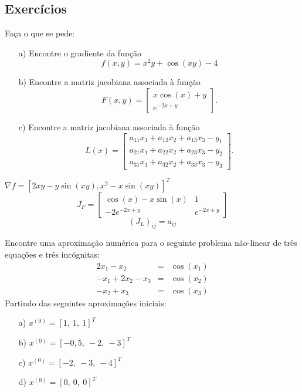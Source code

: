 
\fi

\subsection*{Exercícios}

\begin{exer} Faça o que se pede:
\begin{itemize}
\item[a)] Encontre o gradiente da função $$f(x,y)=x^2y+\cos(xy)-4$$
\item[b)] Encontre a matriz jacobiana associada à função
$$F(x,y)=\left[\begin{array}{c}x\cos(x)+y\\ e^{-2x+y}\end{array} \right].$$
\item[c)] Encontre a matriz jacobiana associada à função
$$L(x)=\left[\begin{array}{c}
a_{11}x_1 + a_{12}x_2 +a_{13}x_3-y_1\\
a_{21}x_1 + a_{22}x_2 +a_{23}x_3-y_2\\
a_{31}x_1 + a_{32}x_2 +a_{33}x_3-y_3
\end{array}
 \right].$$
\end{itemize}

 \end{exer}

\begin{resp}
$\nabla f = [2xy-y\sin(xy), x^2-x\sin(xy)]^T$
$$J_F=\left[\begin{array}{cc}
\cos(x)-x\sin(x) & 1\\
-2e^{-2x+y} &e^{-2x+y}
\end{array}
\right]$$
$$\left(J_L\right)_{ij}=a_{ij}$$
\end{resp}


\begin{exer} Encontre uma aproximação numérica para o seguinte problema não-linear de três equações e três incógnitas:
\begin{eqnarray*}
2x_1-x_2&=&\cos(x_1)\\
-x_1+2x_2-x_3&=&\cos(x_2)\\
-x_2+	x_3&=&\cos(x_3)
\end{eqnarray*}
Partindo das seguintes aproximações iniciais:
\begin{itemize}
\item[a)] $x^{(0)}=[1,~1,~1]^T$
\item[b)] $x^{(0)}=[-0,5,~-2,~-3]^T$
\item[c)] $x^{(0)}=[-2,~-3,~-4]^T$
\item[d)] $x^{(0)}=[0,~0,~0]^T$
\end{itemize}
\end{exer}



